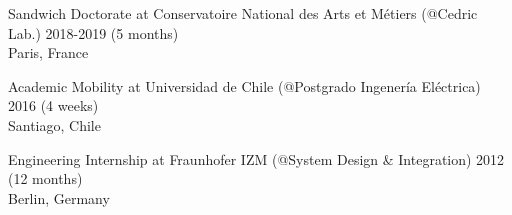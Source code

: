 Sandwich Doctorate at Conservatoire National des Arts et Métiers (@Cedric Lab.) \hfill 2018-2019 (5 months) \\
Paris, France \hfill
\newline

Academic Mobility at Universidad de Chile (@Postgrado Ingenería Eléctrica) \hfill 2016 (4 weeks)\\
Santiago, Chile \hfill
\newline

Engineering Internship at Fraunhofer IZM (@System Design \& Integration) \hfill 2012 (12 months)\\
Berlin, Germany \hfill

